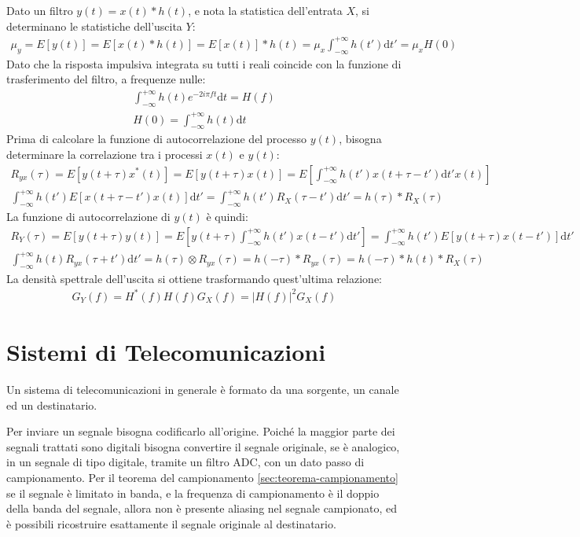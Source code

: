 \documentclass{article}
\newcommand{\df}{\mathrm{d}}
\numberwithin{equation}{subsection}
\begin{document}
Dato un filtro $y(t)=x(t)*h(t)$, e nota la statistica dell'entrata $X$, si determinano le statistiche dell'uscita $Y$:
\begin{gather*}
    \mu_y=E[y(t)]=E[x(t)*h(t)]=E[x(t)]*h(t)=\displaystyle\mu_x\int_{-\infty}^{+\infty}h(t')\df t'=\mu_xH(0)
\end{gather*}
Dato che la risposta impulsiva integrata su tutti i reali coincide con la funzione di trasferimento del filtro, a frequenze nulle:
\begin{gather*}
    \displaystyle\int_{-\infty}^{+\infty}h(t)e^{-2i\pi ft}\df t=H(f)\\
    H(0)=\displaystyle\int_{-\infty}^{+\infty}h(t)\df t
\end{gather*}
Prima di calcolare la funzione di autocorrelazione del processo $y(t)$, bisogna determinare la correlazione tra i processi $x(t)$ e $y(t)$:
\begin{gather*}
    R_{yx}(\tau)=E[y(t+\tau)x^*(t)]=E[y(t+\tau)x(t)]=E\left[\displaystyle\int_{-\infty}^{+\infty}h(t')x(t+\tau-t')\df t'x(t)\right]\\
    \displaystyle\int_{-\infty}^{+\infty}h(t')E[x(t+\tau-t')x(t)]\df t'=\displaystyle\int_{-\infty}^{+\infty}h(t')R_X(\tau-t')\df t'=h(\tau)*R_X(\tau)
\end{gather*}
La funzione di autocorrelazione di $y(t)$ è quindi:
\begin{gather*}
    R_Y(\tau)=E[y(t+\tau)y(t)]=E\left[y(t+\tau)\displaystyle\int_{-\infty}^{+\infty}h(t')x(t-t')\df t'\right]=\int_{-\infty}^{+\infty}h(t')E[y(t+\tau)x(t-t')]\df t'\\
    \displaystyle\int_{-\infty}^{+\infty}h(t)R_{yx}(\tau+t')\df t'=h(\tau)\otimes R_{yx}(\tau)=h(-\tau)*R_{yx}(\tau)=h(-\tau)*h(t)*R_X(\tau)
\end{gather*}
La densità spettrale dell'uscita si ottiene trasformando quest'ultima relazione:
\begin{gather*}
    G_Y(f)=H^*(f)H(f)G_X(f)=|H(f)|^2G_X(f)
\end{gather*}

\clearpage

\section{Sistemi di Telecomunicazioni}

Un sistema di telecomunicazioni in generale è formato da una sorgente, un canale ed un destinatario. 

Per inviare un segnale bisogna codificarlo all'origine. Poiché la maggior parte dei segnali trattati sono digitali bisogna convertire il segnale 
originale, se è analogico, in un segnale di tipo digitale, tramite un filtro ADC, con un dato passo di campionamento. 
Per il teorema del campionamento \ref{sec:teorema-campionamento} se il segnale è limitato in banda, e la frequenza di campionamento è il doppio della banda del segnale, 
allora non è presente aliasing nel segnale campionato, ed è possibili ricostruire esattamente il segnale originale al destinatario. 
\end{document}
